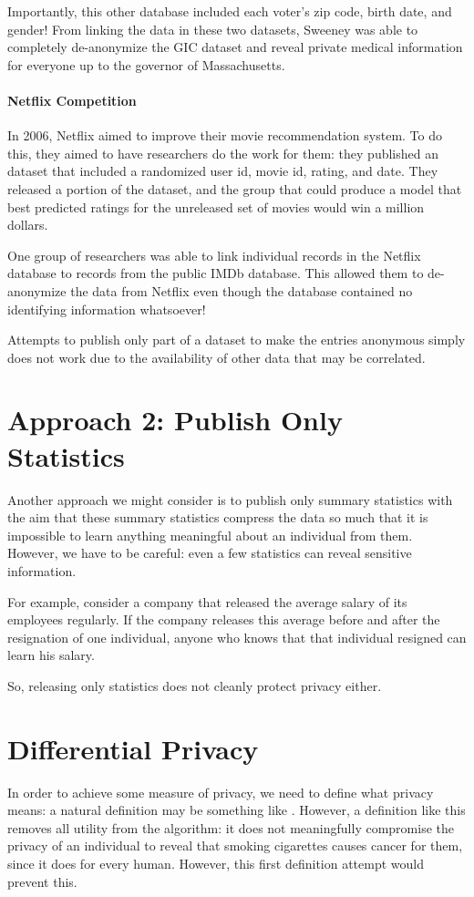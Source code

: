 Importantly, this other database included each voter's zip code, birth date, and gender! From linking the data in these two datasets, Sweeney was able to completely de-anonymize the GIC dataset and reveal private medical information for everyone up to the governor of Massachusetts.

\paragraph{Netflix Competition}
In 2006, Netflix aimed to improve their movie recommendation system. To do this, they aimed to have researchers do the work for them: they published an  dataset that included a randomized user id, movie id, rating, and date. They released a portion of the dataset, and the group that could produce a model that best predicted ratings for the unreleased set of movies would win a million dollars. 

One group of researchers was able to link individual records in the Netflix database to records from the public IMDb database. This allowed them to de-anonymize the data from Netflix even though the database contained no identifying information whatsoever!

Attempts to publish only part of a dataset to make the entries anonymous simply does not work due to the availability of other data that may be correlated. 

\section{Approach 2: Publish Only Statistics}
Another approach we might consider is to publish only summary statistics with the aim that these summary statistics compress the data so much that it is impossible to learn anything meaningful about an individual from them. However, we have to be careful: even a few statistics can reveal sensitive information.

For example, consider a company that released the average salary of its employees regularly. If the company releases this average before and after the resignation of one individual, anyone who knows that that individual resigned can learn his salary.

So, releasing only statistics does not cleanly protect privacy either. 

\section{Differential Privacy}
In order to achieve some measure of privacy, we need to define what privacy means: a natural definition may be something like . However, a definition like this removes all utility from the algorithm: it does not meaningfully compromise the privacy of an individual to reveal that smoking cigarettes causes cancer for them, since it does for every human. However, this first definition attempt would prevent this.

